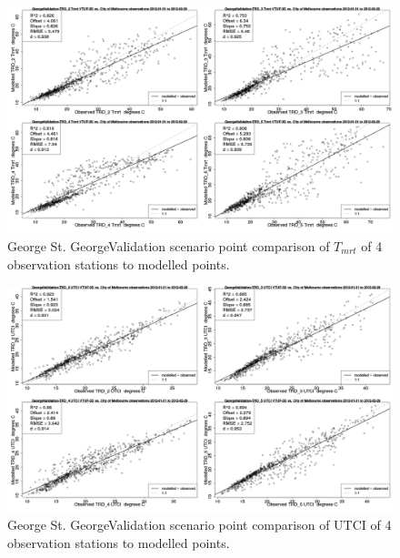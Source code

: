 \documentclass[final,3p,times,authoryear]{elsarticle}
\begin{document}
\begin{figure}[!htbp]
\includegraphics[trim = 0mm 0mm 0mm 0mm, clip, scale=0.30]{images/GeorgeValidation-ErrorPlots-Tmrt5.png}
\caption{George St. GeorgeValidation scenario point comparison of $T_{mrt}$ of 4 observation stations to modelled points.\label{fig:GeorgeStTmrtCompare}} 
\end{figure}

\begin{figure}[!htbp]
\includegraphics[trim = 0mm 0mm 0mm 0mm, clip, scale=0.30]{images/GeorgeValidation-ErrorPlots-UTCI5.png}
\caption{George St. GeorgeValidation scenario point comparison of UTCI of 4 observation stations to modelled points.\label{fig:GeorgeStUtciCompare}} 
\end{figure}
\end{document}

